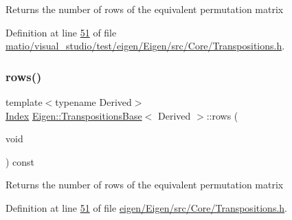 \begin{DoxyReturn}{Returns}
the number of rows of the equivalent permutation matrix 
\end{DoxyReturn}


Definition at line \hyperlink{matio_2visual__studio_2test_2eigen_2_eigen_2src_2_core_2_transpositions_8h_source_l00051}{51} of file \hyperlink{matio_2visual__studio_2test_2eigen_2_eigen_2src_2_core_2_transpositions_8h_source}{matio/visual\+\_\+studio/test/eigen/\+Eigen/src/\+Core/\+Transpositions.\+h}.

\mbox{\label{class_eigen_1_1_transpositions_base_a8c073f17542a8fc9ac581c17f6cdc8d3}} 
\subsubsection{\texorpdfstring{rows()}{rows()}\hspace{0.1cm}{\footnotesize\ttfamily [2/2]}}
{\footnotesize\ttfamily template$<$typename Derived$>$ \\
\hyperlink{class_eigen_1_1_transpositions_base_a3f5f06118b419e8e6ccbe49ed5b4c91f}{Index} \hyperlink{class_eigen_1_1_transpositions_base}{Eigen\+::\+Transpositions\+Base}$<$ Derived $>$\+::rows (\begin{DoxyParamCaption}\item[{void}]{ }\end{DoxyParamCaption}) const\hspace{0.3cm}{\ttfamily [inline]}}

\begin{DoxyReturn}{Returns}
the number of rows of the equivalent permutation matrix 
\end{DoxyReturn}


Definition at line \hyperlink{eigen_2_eigen_2src_2_core_2_transpositions_8h_source_l00051}{51} of file \hyperlink{eigen_2_eigen_2src_2_core_2_transpositions_8h_source}{eigen/\+Eigen/src/\+Core/\+Transpositions.\+h}.

\mbox{\label{class_eigen_1_1_transpositions_base_a8da379438691ea694948ea5ae31d305f}} 
